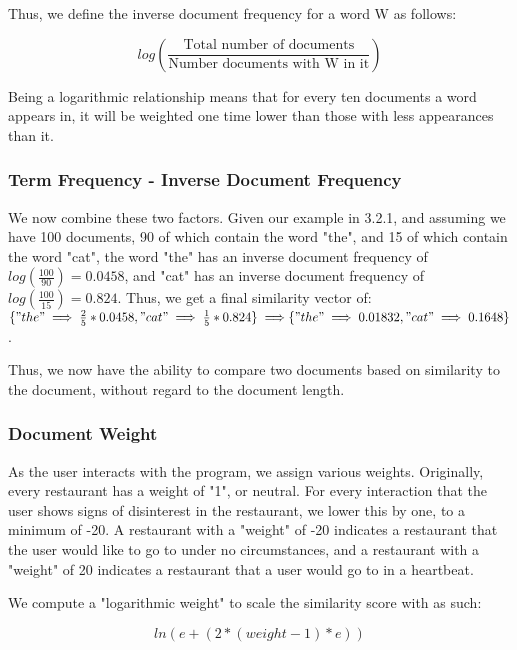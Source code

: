 \documentclass{article}
\begin{document}
            Thus, we define the inverse document frequency for a word W as follows:
            
            \begin{equation}
                log(\frac{\text{Total number of documents}}{\text{Number documents with W in it}})
            \end{equation}
        
            Being a logarithmic relationship means that for every ten documents a word appears in, it will be weighted one time lower than those with less 
appearances than it.
            
        \subsubsection{Term Frequency - Inverse Document Frequency}
            We now combine these two factors. Given our example in 3.2.1, and assuming we have 100 documents, 90 of which contain the word "the", and 15 of 
which contain the word "cat", the word "the" has an inverse document frequency of $log(\frac{100}{90})=0.0458$, and "cat" has an inverse document frequency of 
$log(\frac{100}{15})=0.824$. Thus, we get a final similarity vector of: $\{"the" \implies {\frac{2}{5} * 0.0458}, "cat" \implies {\frac{1}{5} * 0.824}\} 
\implies \\ \{"the" \implies 0.01832, "cat" \implies 0.1648\}$.
            
            Thus, we now have the ability to compare two documents based on similarity to the document, without regard to the document length.
        
        \subsubsection{Document Weight}
            As the user interacts with the program, we assign various weights. Originally, every restaurant has a weight of "1", or neutral. For every 
interaction that the user shows signs of disinterest in the restaurant, we lower this by one, to a minimum of -20. A restaurant with a "weight" of -20 indicates 
a restaurant that the user would like to go to under no circumstances, and a restaurant with a "weight" of 20 indicates a restaurant that a user would go to in 
a heartbeat.
        
        We compute a "logarithmic weight" to scale the similarity score with as such:
        
        \begin{equation}
            ln(e + (2 * (weight - 1) * e))
        \end{equation}
        
\end{document}
